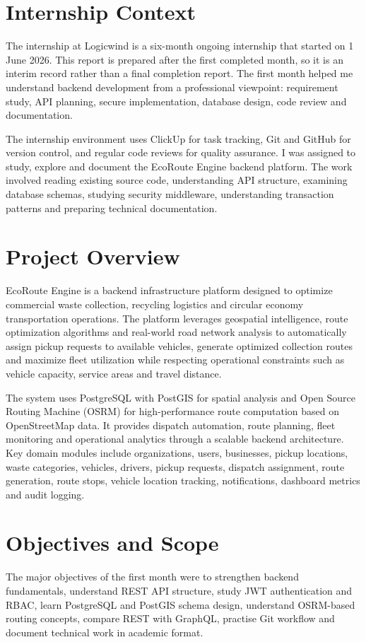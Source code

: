\documentclass[12pt,a4paper]{report}
\begin{document}
\section{Internship Context}
The internship at Logicwind is a six-month ongoing internship that started on 1 June 2026. This report is prepared after the first completed month, so it is an interim record rather than a final completion report. The first month helped me understand backend development from a professional viewpoint: requirement study, API planning, secure implementation, database design, code review and documentation.

The internship environment uses ClickUp for task tracking, Git and GitHub for version control, and regular code reviews for quality assurance. I was assigned to study, explore and document the EcoRoute Engine backend platform. The work involved reading existing source code, understanding API structure, examining database schemas, studying security middleware, understanding transaction patterns and preparing technical documentation.

\section{Project Overview}
EcoRoute Engine is a backend infrastructure platform designed to optimize commercial waste collection, recycling logistics and circular economy transportation operations. The platform leverages geospatial intelligence, route optimization algorithms and real-world road network analysis to automatically assign pickup requests to available vehicles, generate optimized collection routes and maximize fleet utilization while respecting operational constraints such as vehicle capacity, service areas and travel distance.

The system uses PostgreSQL with PostGIS for spatial analysis and Open Source Routing Machine (OSRM) for high-performance route computation based on OpenStreetMap data. It provides dispatch automation, route planning, fleet monitoring and operational analytics through a scalable backend architecture. Key domain modules include organizations, users, businesses, pickup locations, waste categories, vehicles, drivers, pickup requests, dispatch assignment, route generation, route stops, vehicle location tracking, notifications, dashboard metrics and audit logging.

\section{Objectives and Scope}
The major objectives of the first month were to strengthen backend fundamentals, understand REST API structure, study JWT authentication and RBAC, learn PostgreSQL and PostGIS schema design, understand OSRM-based routing concepts, compare REST with GraphQL, practise Git workflow and document technical work in academic format.
\end{document}
